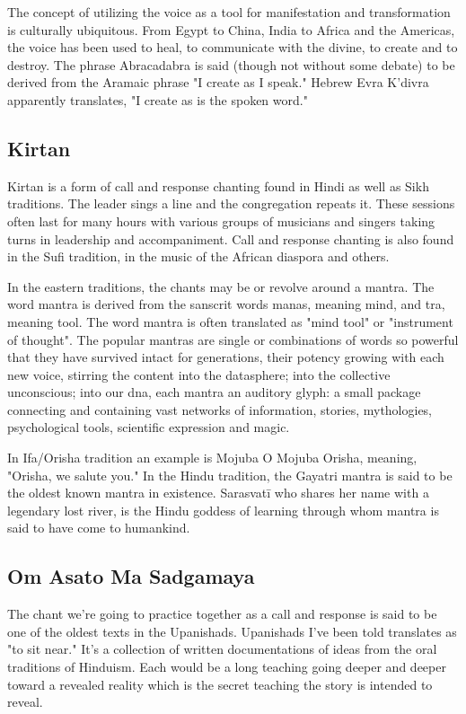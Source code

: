 \documentclass[12pt]{article}
\begin{document}
The concept of utilizing the voice as a tool for manifestation and transformation is culturally ubiquitous. From Egypt to China, India to Africa and the Americas, the voice has been used to heal, to communicate with the divine, to create and to destroy. The phrase Abracadabra is said (though not without some debate) to be derived from the Aramaic phrase "I create as I speak." Hebrew Evra K'divra apparently translates, "I create as is the spoken word."

\subsection*{Kirtan}

Kirtan is a form of call and response chanting found in Hindi as well as Sikh traditions. The leader sings a line and the congregation repeats it. These sessions often last for many hours with various groups of musicians and singers taking turns in leadership and accompaniment. Call and response chanting is also found in the Sufi tradition, in the music of the African diaspora and others.

In the eastern traditions, the chants may be or revolve around a mantra. The word mantra is derived from the sanscrit words manas, meaning mind, and tra, meaning tool. The word mantra is often translated as "mind tool" or "instrument of thought". The popular mantras are single or combinations of words so powerful that they have survived intact for generations, their potency growing with each new voice, stirring the content into the datasphere; into the collective unconscious; into our dna, each mantra an auditory glyph: a small package connecting and containing vast networks of information, stories, mythologies, psychological tools, scientific expression and magic.

In Ifa/Orisha tradition an example is Mojuba O Mojuba Orisha, meaning, "Orisha, we salute you." In the Hindu tradition, the Gayatri mantra is said to be the oldest known mantra in existence. Sarasvatī who shares her name with a legendary lost river, is the Hindu goddess of learning through whom mantra is said to have come to humankind.

\subsection*{Om Asato Ma Sadgamaya}

The chant we're going to practice together as a call and response is said to be one of the oldest texts in the Upanishads. Upanishads I've been told translates as "to sit near." It's a collection of written documentations of ideas from the oral traditions of Hinduism. Each would be a long teaching going deeper and deeper toward a revealed reality which is the secret teaching the story is intended to reveal.
\end{document}
